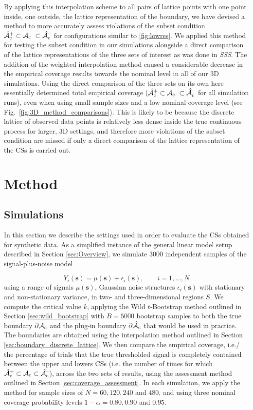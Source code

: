 By applying this interpolation scheme to all pairs of lattice points with one point inside, one outside, the lattice representation of the boundary, we have devised a method to more accurately assess violations of the subset condition $\Ahatcp \subset \Ac \ \subset \Ahatcm$ for configurations similar to \ref{fig:lowres}. We applied this method for testing the subset condition in our simulations alongside a direct comparison of the lattice representations of the three sets of interest as was done in \textit{SSS}. The addition of the weighted interpolation method caused a considerable decrease in the empirical coverage results towards the nominal level in all of our 3D simulations. Using the direct comparison of the three sets on its own here essentially determined total empirical coverage ($\Ahatcp \subset \Ac \ \subset \Ahatcm$ for all simulation runs), even when using small sample sizes and a low nominal coverage level (see Fig.\ \ref{fig:3D_method_comparisons}). This is likely to be because the discrete lattice of observed data points is relatively less dense inside the true continuous process for larger, 3D settings, and therefore more violations of the subset condition are missed if only a direct comparison of the lattice representation of the CSs is carried out.

\section{Method}
\subsection{Simulations}
\label{sec:simulations}
In this section we describe the settings used in order to evaluate the CSs obtained for synthetic data. As a simplified instance of the general linear model setup described in Section \ref{sec:Overview}, we simulate 3000 independent samples of the signal-plus-noise model

$$Y_{i}(\bm{s}) = \mu(\bm{s}) + \epsilon_{i}(\bm{s}), \qquad i = 1, ..., N$$
using a range of signals $\mu(\bm{s})$, Gaussian noise structures $\epsilon_{i}(\bm{s})$ with stationary and non-stationary variance, in two- and three-dimensional regions $S$. We compute the critical value $k$, applying the Wild $t$-Bootstrap method outlined in Section \ref{sec:wild_bootstrap} with $B = 5000$ bootstrap samples to both the true boundary $\operatorname{\partial\mathcal{A}_{c}}$ and the plug-in boundary $\operatorname{\partial\hat{\mathcal{A}}_{c}}$ that would be used in practice. The boundaries are obtained using the interpolation method outlined in Section \ref{sec:boundary_discrete_lattice}. We then compare the empirical coverage, i.e./ the percentage of trials that the true thresholded signal is completely contained between the upper and lowers CSs (i.e. the number of times for which $\operatorname{\hat{\mathcal{A}}_{c}^+} \subset \operatorname{\mathcal{A}_{c}} \subset \operatorname{\hat{\mathcal{A}}_{c}^{\textrm{--}}}$), across the two sets of results, using the assessment method outlined in Section \ref{sec:coverage_assessment}. In each simulation, we apply the method for sample sizes of $N = 60, 120, 240$ and $480$, and using three nominal coverage probability levels $1 - \alpha = 0.80, 0.90$ and $0.95$.

